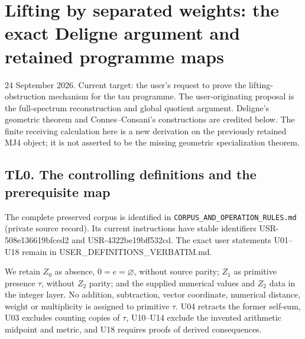 \section{Lifting by separated weights: the exact Deligne argument and
retained programme
maps}\label{lifting-by-separated-weights-the-exact-deligne-argument-and-retained-programme-maps}

24 September 2026. Current target: the user's request to prove the
lifting-obstruction mechanism for the tau programme. The
user-originating proposal is the full-spectrum reconstruction and global
quotient argument. Deligne's geometric theorem and Connes--Consani's
constructions are credited below. The finite receiving calculation here
is a new derivation on the previously retained MJ4 object; it is not
asserted to be the missing geometric specialization theorem.

\subsection{TL0. The controlling definitions and the prerequisite
map}\label{tl0.-the-controlling-definitions-and-the-prerequisite-map}

The complete preserved corpus is identified in
\nolinkurl{CORPUS_AND_OPERATION_RULES.md} (private source record). Its current instructions have
stable identifiers USR-508e136619bfced2 and USR-4322be19bff532cd. The
exact user statements U01--U18 remain in
{USER\_DEFINITIONS\_VERBATIM.md}.

We retain \(Z_0\) as absence, \(0=e=\varnothing\), without source
parity; \(Z_1\) as primitive presence \(\tau\), without \(Z_2\) parity;
and the supplied numerical values and \(Z_2\) data in the integer layer.
No addition, subtraction, vector coordinate, numerical distance, weight
or multiplicity is assigned to primitive \(\tau\). U04 retracts the
former self-sum, U03 excludes counting copies of \(\tau\), U10--U14
exclude the invented arithmetic midpoint and metric, and U18 requires
proofs of derived consequences.

